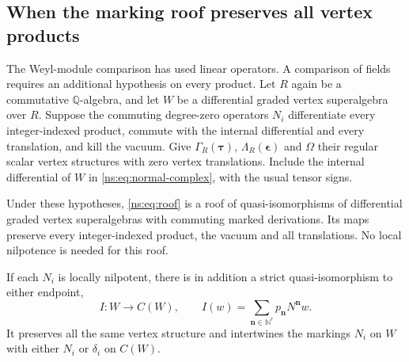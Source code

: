 \subsection{When the marking roof preserves all vertex products}

The Weyl-module comparison has used linear operators.  A comparison
of fields requires an additional hypothesis on every product.
Let \(R\) again be a commutative \(\mathbb Q\)-algebra, and let
\(W\) be a differential graded vertex superalgebra over \(R\).
Suppose the commuting degree-zero operators \(N_i\) differentiate
every integer-indexed product, commute with the internal differential
and every translation, and kill the vacuum.  Give
\(\Gamma_R(\boldsymbol\tau)\), \(\Lambda_R(\boldsymbol\epsilon)\)
and \(\Omega\) their regular scalar vertex structures with zero
vertex translations.  Include the internal differential of \(W\)
in \eqref{ns:eq:normal-complex}, with the usual tensor signs.

\begin{proposition}\label{ns:prop:vertex}
Under these hypotheses, \eqref{ns:eq:roof} is a roof of
quasi-isomorphisms of differential graded vertex superalgebras with
commuting marked derivations.  Its maps preserve every integer-indexed
product, the vacuum and all translations.  No local nilpotence is
needed for this roof.

If each \(N_i\) is locally nilpotent, there is in addition a strict
quasi-isomorphism to either endpoint,
\begin{equation}\label{ns:eq:horizontal}
 I:W\longrightarrow C(W),\qquad
 I(w)=\sum_{\boldsymbol n\in\mathbb N^r}
               p_{\boldsymbol n}N^{\boldsymbol n}w.
\end{equation}
It preserves all the same vertex structure and intertwines the
markings \(N_i\) on \(W\) with either \(N_i\) or \(\delta_i\)
on \(C(W)\).
\end{proposition}

